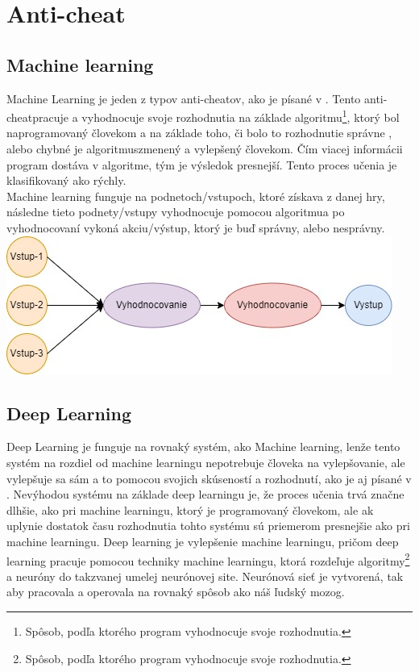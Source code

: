 \documentclass[twoside,twocolumn]{article}
\begin{document}

\section{Anti-cheat}
\subsection{Machine learning}
Machine Learning je jeden z typov anti-cheatov\footnotemark[4], ako je písané v \cite{willman2020machine}. Tento anti-cheat\footnotemark[4] pracuje a vyhodnocuje svoje rozhodnutia na základe algoritmu\footnote[10]{Spôsob, podľa ktorého program vyhodnocuje svoje rozhodnutia.}, ktorý bol naprogramovaný človekom a na základe toho, či bolo to rozhodnutie správne , alebo chybné je algoritmus\footnotemark[10] zmenený a vylepšený človekom. Čím viacej informácii program dostáva v algoritme\footnotemark[10], tým je výsledok presnejší. Tento proces učenia je klasifikovaný ako rýchly. \\
Machine learning funguje na podnetoch/vstupoch, ktoré získava z danej hry, následne tieto podnety/vstupy vyhodnocuje pomocou algoritmu\footnotemark[10] a po vyhodnocovaní vykoná akciu/výstup, ktorý je buď správny, alebo nesprávny.\\

\textnormal{\includegraphics[scale=0.42]{Machine learning proces diagram.jpg}}
\label{machine learning proces}


\subsection{Deep Learning}
Deep Learning je funguje na rovnaký systém, ako Machine learning, lenže tento systém na rozdiel od machine learningu nepotrebuje človeka na vylepšovanie, ale vylepšuje sa sám a to pomocou svojich skúseností a rozhodnutí, ako je aj písané v \cite{zhang2021improvement}. Nevýhodou systému na základe deep learningu je, že proces učenia trvá značne dlhšie, ako pri machine learningu, ktorý je programovaný človekom, ale ak uplynie dostatok času rozhodnutia tohto systému sú priemerom presnejšie ako pri machine learningu.
Deep learning je vylepšenie machine learningu, pričom deep learning pracuje pomocou techniky machine learningu, ktorá rozdeľuje algoritmy\footnote{Spôsob, podľa ktorého program vyhodnocuje svoje rozhodnutia.} a neuróny do takzvanej umelej neurónovej site. Neurónová sieť je vytvorená, tak aby pracovala a operovala na rovnaký spôsob ako náš ľudský mozog.
\end{document}
